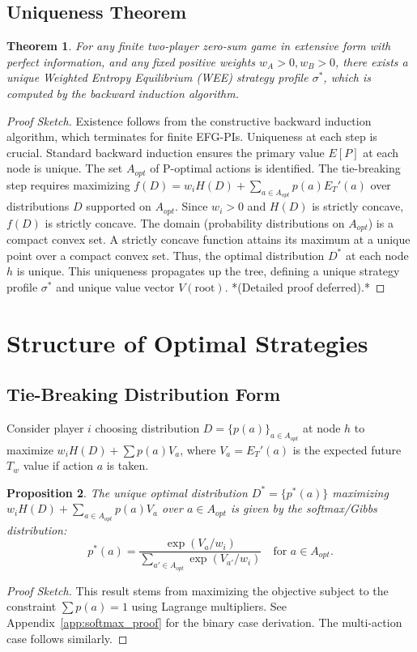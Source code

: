 \documentclass{article}
\newtheorem{theorem}{Theorem}[section]
\newtheorem{proposition}[theorem]{Proposition}
\begin{document}
\subsection{Uniqueness Theorem}
\begin{theorem} \label{thm:uniqueness}
For any finite two-player zero-sum game in extensive form with perfect information, and any fixed positive weights $w_A > 0, w_B > 0$, there exists a unique Weighted Entropy Equilibrium (WEE) strategy profile $\sigma^*$, which is computed by the backward induction algorithm.
\end{theorem}
\begin{proof}[Proof Sketch]
Existence follows from the constructive backward induction algorithm, which terminates for finite EFG-PIs. Uniqueness at each step is crucial. Standard backward induction ensures the primary value $E[P]$ at each node is unique. The set $A_{opt}$ of P-optimal actions is identified. The tie-breaking step requires maximizing $f(D) = w_i H(D) + \sum_{a \in A_{opt}} p(a) E_T'(a)$ over distributions $D$ supported on $A_{opt}$. Since $w_i > 0$ and $H(D)$ is strictly concave, $f(D)$ is strictly concave. The domain (probability distributions on $A_{opt}$) is a compact convex set. A strictly concave function attains its maximum at a unique point over a compact convex set. Thus, the optimal distribution $D^*$ at each node $h$ is unique. This uniqueness propagates up the tree, defining a unique strategy profile $\sigma^*$ and unique value vector $V(\text{root})$. *(Detailed proof deferred).*
\end{proof}

\section{Structure of Optimal Strategies}

\subsection{Tie-Breaking Distribution Form}
Consider player $i$ choosing distribution $D = \{p(a)\}_{a \in A_{opt}}$ at node $h$ to maximize $w_i H(D) + \sum p(a) V_a$, where $V_a = E_T'(a)$ is the expected future $T_w$ value if action $a$ is taken.
\begin{proposition} \label{prop:softmax}
The unique optimal distribution $D^* = \{p^*(a)\}$ maximizing $w_i H(D) + \sum_{a \in A_{opt}} p(a) V_a$ over $a \in A_{opt}$ is given by the softmax/Gibbs distribution:
\[ p^*(a) = \frac{\exp(V_a / w_i)}{\sum_{a' \in A_{opt}} \exp(V_{a'} / w_i)} \quad \text{for } a \in A_{opt}. \]
\end{proposition}
\begin{proof}[Proof Sketch]
This result stems from maximizing the objective subject to the constraint $\sum p(a) = 1$ using Lagrange multipliers. See Appendix~\ref{app:softmax_proof} for the binary case derivation. The multi-action case follows similarly.
\end{proof}
\end{document}
